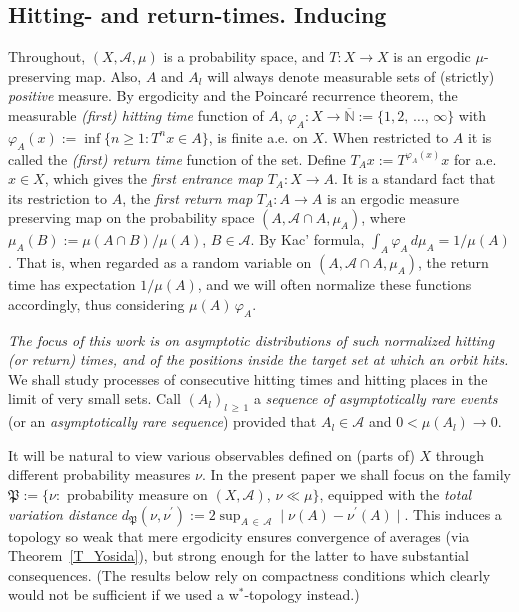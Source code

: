 \documentclass[AHL,Unicode,longabstracts]{cedram}
\newcommand{\clA}{\mathcal{A}}
\newcommand{\frkP}{\mathfrak{P}}
\newcommand{\bbN}{\mathbb{N}}
\begin{document}
\subsection{Hitting- and return-times. Inducing}
Throughout, $(X,\clA,\mu)$ is a probability space, and $T:X\rightarrow X$ is an ergodic $\mu $-preserving map. Also, $A$ and $A_{l}$ will always denote measurable sets of (strictly) \emph{positive} measure. By ergodicity and the Poincaré recurrence theorem, the measurable \emph{(first) hitting time} function of $A $, $\varphi_{A}:X\rightarrow\overline{\bbN}:=\{1,2,\,\ldots,\,\infty\}$ with $\varphi_{A}(x):=\inf\{n\geq1:T^{n}x\in A\}$, is finite a.e. on $X$. When restricted to $A$ it is called the \emph{(first) return time} function of the set. Define $T_{A}x:=T^{\varphi_{A}(x)}x$ for a.e. $x\in X$, which gives the
\emph{first entrance map} $T_{A}:X\rightarrow A$. It is a standard fact that its restriction to $A$, the \emph{first return map} $T_{A}:A\rightarrow A$ is an ergodic measure preserving map on the probability space $(A,\clA\cap A,\mu_{A})$, where $\mu_{A}(B):=\mu(A\cap B)/\mu(A)$, $B\in\clA$. By Kac' formula, $\int_{A}\varphi_{A}\,d\mu_{A}=1/\mu(A)$. That is, when regarded as a random variable on $(A,\clA\cap A,\mu_{A})$, the return time has expectation $1/\mu(A)$, and we will often normalize these functions accordingly, thus considering $\mu(A)\,\varphi_{A}$.

\emph{The focus of this work is on asymptotic distributions of such normalized hitting (or return) times, and of the positions inside the target set at which an orbit hits.} We shall study processes of consecutive hitting times and hitting places in the limit of very small sets. Call $(A_{l})_{l\,\geq\,1}$ a \emph{sequence of asymptotically rare events} (or an
\emph{asymptotically rare sequence}) provided that $A_{l}\in\clA$ and $0<\mu(A_{l})\rightarrow0$.

It will be natural to view various observables defined on (parts of) $X$ through different probability measures $\nu$. In the present paper we shall focus on the family $\frkP:=\{\nu:$ probability measure on $(X,\clA)$, $\nu\ll\mu\}$, equipped with the \emph{total variation distance} $d_{\frkP}(\nu,\nu^{\prime}):=2\sup_{A\,\in\,\clA}\mid
\nu(A)-\nu^{\prime}(A)\mid$. This induces a topology so weak that mere ergodicity ensures convergence of averages (via Theorem~\ref{T_Yosida}), but strong enough for the latter to have substantial consequences. (The results below rely on compactness conditions which clearly would not be sufficient if we used a w$^{\ast}$-topology instead.)
\end{document}

